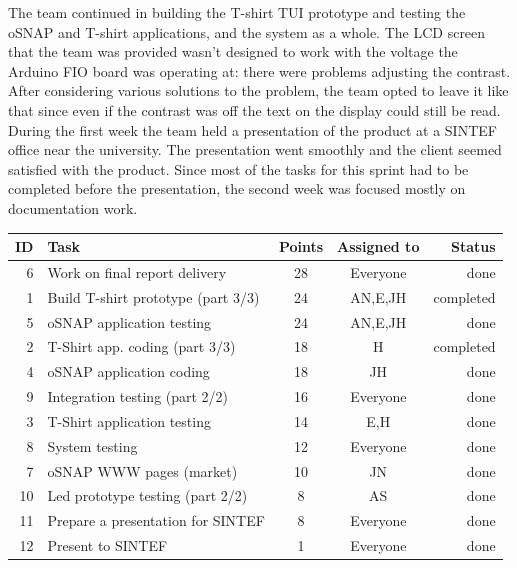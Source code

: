 The team continued in building the T-shirt TUI prototype and testing
the oSNAP and T-shirt applications, and the system as a whole.
The LCD screen that the team was provided wasn't designed to work with the
voltage the Arduino FIO board was operating at: there were problems adjusting
the contrast. After considering various solutions to the problem, the team
opted to leave it like that since even if the contrast was off the text on the
display could still be read. During the first week the team held a presentation
of the product at a SINTEF office near the university. The presentation went
smoothly and the client seemed satisfied with the product. Since most of the
tasks for this sprint had to be completed before the presentation, the second
week was focused mostly on documentation work.


\begin{table}[ht!]
\begin{tabular}{ | r | l | c | c | r | }

\hline
\textbf{ID} & \textbf{Task} & \textbf{Points} & \textbf{Assigned to} & \textbf{Status} \\
\hline

 6 & Work on final report delivery				& 28 & Everyone	& done \\
\hline
 1 & Build T-shirt prototype (part 3/3)			& 24 & AN,E,JH	& completed \\
\hline
 5 & oSNAP application testing					& 24 & AN,E,JH	& done \\
\hline
 2 & T-Shirt app. coding (part 3/3)				& 18 & H		& completed \\
\hline
 4 & oSNAP application coding					& 18 & JH		& done \\
\hline
 9 & Integration testing (part 2/2)				& 16 & Everyone	& done \\
\hline
 3 & T-Shirt application testing 				& 14 & E,H		& done \\
\hline
 8 & System testing								& 12 & Everyone	& done \\
\hline
 7 & oSNAP WWW pages (market)					& 10 & JN		& done \\
\hline
10 & Led prototype testing (part 2/2)			& 8  & AS		& done \\
\hline
11 & Prepare a presentation for SINTEF & 8  & Everyone       & done \\
\hline
12 & Present to SINTEF & 1  & Everyone       & done \\
\hline

\end{tabular}
\end{table}

